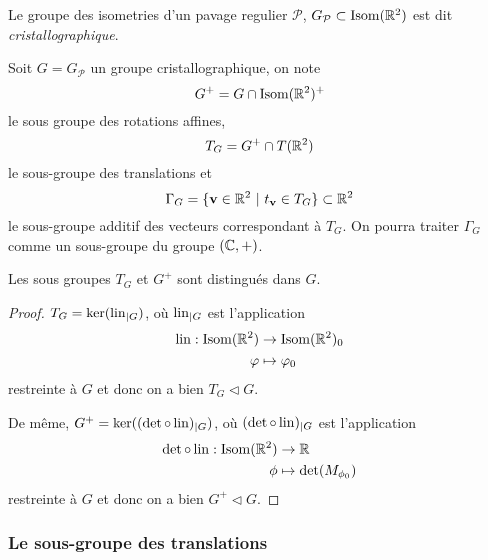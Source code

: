 \begin{definition}
	Le groupe des isometries d'un pavage regulier $\mathcal{P}$,
	$G_\mathcal{P} \subset \operatorname{Isom}(\mathbb{R}^2)$ est dit \emph{cristallographique}.
\end{definition}

\begin{notation}
	Soit $G = G_\mathcal{P}$ un groupe cristallographique, on note
	\begin{equation*}
		G^+=G\cap\operatorname{Isom}(\mathbb{R}^2)^+
	\end{equation*}
	le sous groupe des rotations affines,
	\begin{equation*}
		T_G = G^+ \cap T(\mathbb{R}^2)
	\end{equation*}
	le sous-groupe des translations et
	\begin{equation*}
		\Gamma_G = \{\mathbf{v} \in \mathbb{R}^2\ |\ t_{\mathbf{v}} \in T_G\} \subset \mathbb{R}^2
	\end{equation*}
	le sous-groupe additif des vecteurs correspondant à $T_G$.
	On pourra traiter $\Gamma_G$ comme un sous-groupe du groupe $(\mathbb{C}, +)$.

\end{notation}

\begin{proposition}
	Les sous groupes $T_G$ et $G^+$ sont distingués dans $G$.
\end{proposition}

\begin{proof}
	$T_G = \ker(\operatorname{lin}_{|G})$, où $\operatorname{lin}_{|G}$ est l'application
	\begin{align*}
		\operatorname{lin}: \operatorname{Isom}(\mathbb{R}^2) &\to \operatorname{Isom}(\mathbb{R}^2)_0\\
		\varphi &\mapsto \varphi_0
	\end{align*}
	restreinte à $G$ et donc on a bien $T_G \triangleleft G$.  
	
	De même, $G^+ = \ker((\det \circ \operatorname{lin})_{|G})$, où $(\det \circ \operatorname{lin})_{|G}$
	est l'application
	\begin{align*}
		\det \circ \operatorname{lin}: \operatorname{Isom}(\mathbb{R}^2) &\to \mathbb{R}\\
		\phi &\mapsto \det(M_{\phi_0})
	\end{align*}
	restreinte à $G$ et donc on a bien $G^+ \triangleleft G$.
\end{proof}

\subsubsection{Le sous-groupe des translations}

